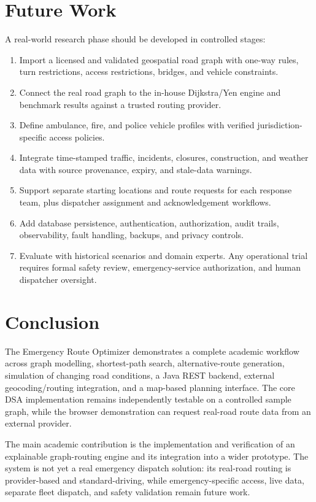 \documentclass[11pt,a4paper]{article}
\begin{document}
\section{Future Work}
A real-world research phase should be developed in controlled stages:
\begin{enumerate}
  \item Import a licensed and validated geospatial road graph with one-way rules, turn restrictions, access restrictions, bridges, and vehicle constraints.
  \item Connect the real road graph to the in-house Dijkstra/Yen engine and benchmark results against a trusted routing provider.
  \item Define ambulance, fire, and police vehicle profiles with verified jurisdiction-specific access policies.
  \item Integrate time-stamped traffic, incidents, closures, construction, and weather data with source provenance, expiry, and stale-data warnings.
  \item Support separate starting locations and route requests for each response team, plus dispatcher assignment and acknowledgement workflows.
  \item Add database persistence, authentication, authorization, audit trails, observability, fault handling, backups, and privacy controls.
  \item Evaluate with historical scenarios and domain experts. Any operational trial requires formal safety review, emergency-service authorization, and human dispatcher oversight.
\end{enumerate}

\section{Conclusion}
The Emergency Route Optimizer demonstrates a complete academic workflow across graph modelling, shortest-path search, alternative-route generation, simulation of changing road conditions, a Java REST backend, external geocoding/routing integration, and a map-based planning interface. The core DSA implementation remains independently testable on a controlled sample graph, while the browser demonstration can request real-road route data from an external provider.

The main academic contribution is the implementation and verification of an explainable graph-routing engine and its integration into a wider prototype. The system is not yet a real emergency dispatch solution: its real-road routing is provider-based and standard-driving, while emergency-specific access, live data, separate fleet dispatch, and safety validation remain future work.
\end{document}
